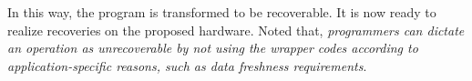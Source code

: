 %
In this way, the program is transformed to be recoverable.
It is now ready to realize recoveries on the proposed hardware. 
Noted that, \emph{programmers can dictate an operation as unrecoverable by not using the wrapper codes according to application-specific reasons, such as data freshness requirements}.

\begin{comment}
\textbf{Optional Recovery Approach}
%
In our design, the integrated master interface of an I/O bus is a non-volatile I/O interface, which utilizes NVFFs to re-initialize and re-configure the I/O bus~\cite{li2016hw}.
No hardware modification is required for the external peripherals. 
The recovery of the operations is optional via software approaches. 
To avoid recovering an operation, the \emph{periTaskID} in the wrapper function as well as the related IR bit is set to zero.

%
The recovery of tasks is application specific and defined by programmers.
However, two kinds of applications are recommended to be recovered to confirm the reliability and achieve higher data acquisition.
First is the applications that rely on hardware interrupts.
Recovering these applications can avoid deadlock caused by un-returned interrupts. 
Second is the normally-off applications requiring frequent 'OFF-ON' switching. 
REMARK realizes fast re-initialization which can improve the data acquisition for long-term periodical data collections.
\end{comment}